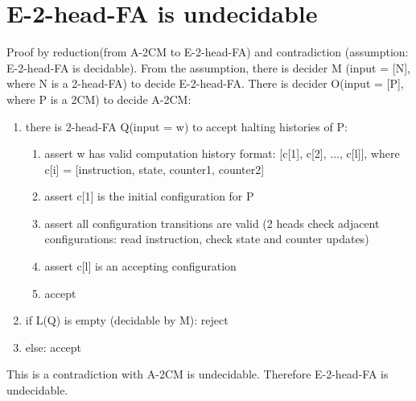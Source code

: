 \documentclass{article}
\begin{document}
\section{E-2-head-FA is undecidable}
Proof by reduction(from A-2CM to E-2-head-FA) and contradiction (assumption: 
E-2-head-FA is decidable).
From the assumption, there is decider M (input = [N], where N is a 2-head-FA) 
to decide E-2-head-FA.
There is decider O(input = [P], where P is a 2CM) to decide A-2CM:
\begin{enumerate}
	\item there is 2-head-FA Q(input = w) to accept halting	histories of P:
	\begin{enumerate}
		\item assert w has valid computation history format: [c[1], c[2], ..., c[l]], where c[i] = [instruction, state, counter1, counter2]
		\item assert c[1] is the initial configuration for P
		\item assert all configuration transitions are valid (2 heads check adjacent configurations: read instruction, check state and counter updates)
		\item assert c[l] is an accepting configuration
		\item accept
	\end{enumerate}
	\item if L(Q) is empty (decidable by M): reject
	\item else: accept
\end{enumerate}
This is a contradiction with A-2CM is undecidable.
Therefore E-2-head-FA is undecidable.
\end{document}
